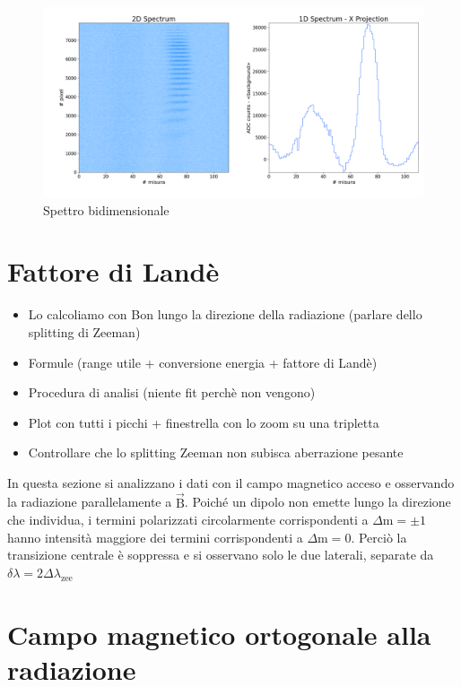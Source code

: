 \documentclass[twocolumn,10pt]{asme2ej}
\begin{document}
\begin{figure}
    \centering
    \includegraphics[width=\textwidth]{../Plots/Boff_2d_spectrum.png}
    \caption{Spettro bidimensionale}
    \label{i:spettro2d_Boff}
\end{figure}


\section{Fattore di Landè}

\begin{itemize}
    \item Lo calcoliamo con Bon lungo la direzione della radiazione (parlare dello splitting di Zeeman)
    \item Formule (range utile + conversione energia + fattore di Landè)
    \item Procedura di analisi (niente fit perchè non vengono)
    \item Plot con tutti i picchi + finestrella con lo zoom su una tripletta 
    \item Controllare che lo splitting Zeeman non subisca aberrazione pesante
\end{itemize}
In questa sezione si analizzano i dati con il campo magnetico acceso e osservando la radiazione parallelamente a $\vec{\text{B}}$.
Poiché un dipolo non emette lungo la direzione che individua, i termini polarizzati circolarmente corrispondenti a $\Delta \text{m} = \pm 1$
hanno intensità maggiore dei termini corrispondenti a $\Delta \text{m} = 0$. Perciò la transizione centrale è soppressa e si osservano solo le due laterali,
separate da $\delta\lambda = 2 \Delta\lambda_{\text{zee}}$

\section{Campo magnetico ortogonale alla radiazione}
\end{document}
